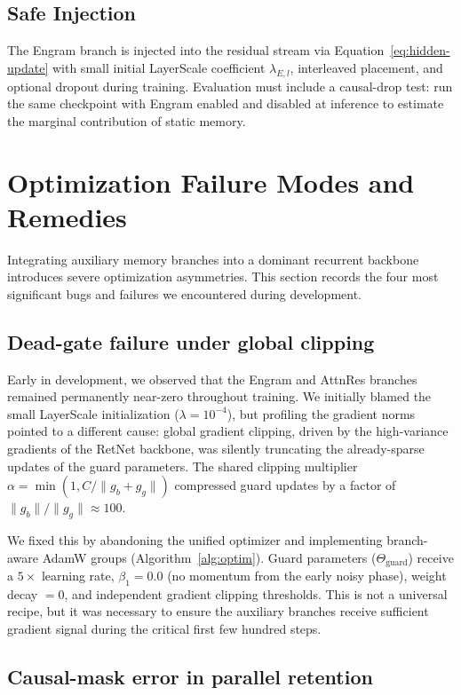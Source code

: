 \documentclass[preprint,12pt]{elsarticle}
\begin{document}
\subsection{Safe Injection}

The Engram branch is injected into the residual stream via Equation~\eqref{eq:hidden-update} with small initial LayerScale coefficient $\lambda_{E,l}$, interleaved placement, and optional dropout during training. Evaluation must include a causal-drop test: run the same checkpoint with Engram enabled and disabled at inference to estimate the marginal contribution of static memory.

\section{Optimization Failure Modes and Remedies}

Integrating auxiliary memory branches into a dominant recurrent backbone introduces severe optimization asymmetries. This section records the four most significant bugs and failures we encountered during development.

\subsection{Dead-gate failure under global clipping}

Early in development, we observed that the Engram and AttnRes branches remained permanently near-zero throughout training. We initially blamed the small LayerScale initialization ($\lambda = 10^{-4}$), but profiling the gradient norms pointed to a different cause: global gradient clipping, driven by the high-variance gradients of the RetNet backbone, was silently truncating the already-sparse updates of the guard parameters. The shared clipping multiplier $\alpha = \min(1, C/\|g_b + g_g\|)$ compressed guard updates by a factor of $\|g_b\|/\|g_g\| \approx 100$.

We fixed this by abandoning the unified optimizer and implementing branch-aware AdamW groups (Algorithm~\ref{alg:optim}). Guard parameters ($\Theta_{\mathrm{guard}}$) receive a $5\times$ learning rate, $\beta_1 = 0.0$ (no momentum from the early noisy phase), weight decay $= 0$, and independent gradient clipping thresholds. This is not a universal recipe, but it was necessary to ensure the auxiliary branches receive sufficient gradient signal during the critical first few hundred steps.

\subsection{Causal-mask error in parallel retention}
\end{document}
